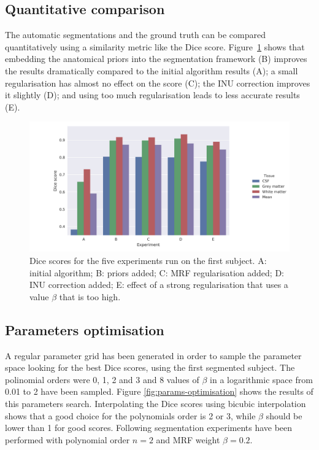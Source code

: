 \subsection{Quantitative comparison}
The automatic segmentations and the ground truth can be compared quantitatively using a similarity metric like the Dice score. Figure~\ref{fig:experiments} shows that embedding the anatomical priors into the segmentation framework (B) improves the results dramatically compared to the initial algorithm results (A); a small regularisation has almost no effect on the score (C); the INU correction improves it slightly (D); and using too much regularisation leads to less accurate results (E).

\begin{figure}
  \centering
  \includegraphics[width=\textwidth]{figures/experiments_dices_bars}
  \caption{Dice scores for the five experiments run on the first subject. A: initial algorithm; B: priors added; C: MRF regularisation added; D: INU correction added; E: effect of a strong regularisation that uses a value $\beta$ that is too high.}
  \label{fig:experiments}
\end{figure}




\subsection{Parameters optimisation}


A regular parameter grid has been generated in order to sample the parameter space looking for the best Dice scores, using the first segmented subject. The polinomial orders were 0, 1, 2 and 3 and 8 values of $\beta$ in a logarithmic space from 0.01 to 2 have been sampled. Figure \ref{fig:params-optimisation} shows the results of this parameters search. Interpolating the Dice scores using bicubic interpolation shows that a good choice for the polynomials order is 2 or 3, while $\beta$ should be lower than 1 for good scores. Following segmentation experiments have been performed with polynomial order $n = 2$ and MRF weight $\beta = 0.2$.



